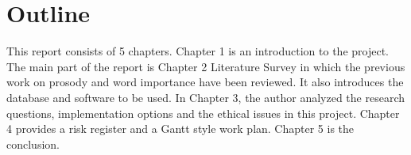 
\section{Outline}
This report consists of 5 chapters. Chapter 1 is an introduction to the project. The main part of the report is Chapter 2 Literature Survey in which the previous work on prosody and word importance have been reviewed. It also introduces the database and software to be used. In Chapter 3, the author analyzed the research questions, implementation options and the ethical issues in this project. Chapter 4 provides a risk register and a Gantt style work plan. Chapter 5 is the conclusion.    



%
%
%
%
%
